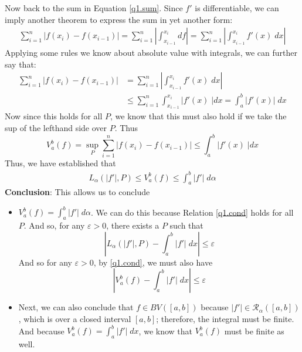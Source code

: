 \documentclass[12pt]{article}
\theoremstyle{plain}
\theoremstyle{definition}
\theoremstyle{remark}
\begin{document}
\begin{enumerate}
Now back to the sum in Equation \ref{q1.sum}. Since $f'$ is differentiable, we can imply another theorem to express the sum in yet another form:
\begin{align*}
    \sum^n_{i=1} |f(x_i) - f(x_{i-1})| = 
        \sum^n_{i=1} \left\lvert \int^{x_i}_{x_{i-1}} df 
        \right\rvert = 
        \sum^n_{i=1} \left\lvert \int^{x_i}_{x_{i-1}} f'(x) \; dx
        \right\rvert 
\end{align*}
Applying some rules we know about absolute value with integrals, we can further say that:
\begin{align*}
    \sum^n_{i=1} |f(x_i) - f(x_{i-1})| &= 
        \sum^n_{i=1} \left\lvert \int^{x_i}_{x_{i-1}} f'(x) \; dx
        \right\rvert \\
    &\leq \sum^n_{i=1} \int^{x_i}_{x_{i-1}} \left\lvert f'(x) \;
        \right\rvert dx  = \int^{b}_{a} \left\lvert f'(x) 
        \right\rvert \; dx  
\end{align*}
Now since this holds for all $P$, we know that this must also hold if we take the sup of the lefthand side over $P$. Thus
\[
    V_a^b(f) = \sup_P
    \sum^n_{i=1} |f(x_i) - f(x_{i-1})|  
    \leq 
    \int^{b}_{a} \left\lvert f'(x) \;
    \right\rvert dx  
\]
Thus, we have established that 
\begin{align}
    L_\alpha(|f'|,P) \leq V_a^b(f) \leq \int^b_a |f'|\;d\alpha
    \label{q1.cond}
\end{align}
\textbf{Conclusion}: This allows us to conclude
\begin{itemize}
    \item $V_a^b(f)  = \int^b_a |f'|\;d\alpha$. We can do this because Relation \ref{q1.cond} holds for all $P$.  And so, for any $\varepsilon>0$, there exists a $P$ such that 
\[ 
    \left\lvert L_\alpha(|f'|,P) - \int^b_a |f'|\;dx 
    \right\rvert \leq \varepsilon 
\]
And so for any $\varepsilon>0$, by \ref{q1.cond}, we must also have
\[ 
    \left\lvert V_a^b(f)  - \int^b_a |f'|\;dx 
    \right\rvert \leq \varepsilon 
\]

\item Next, we can also conclude that $f\in BV([a,b])$ because $|f'|\in\mathscr{R}_\alpha([a,b])$, which is over a closed interval $[a,b]$; therefore, the integral must be finite. And because $V_a^b(f)= \int^b_a |f'|\;dx$, we know that $V_a^b(f)$ must be finite as well.
\end{itemize}


\end{enumerate}
\end{document}
